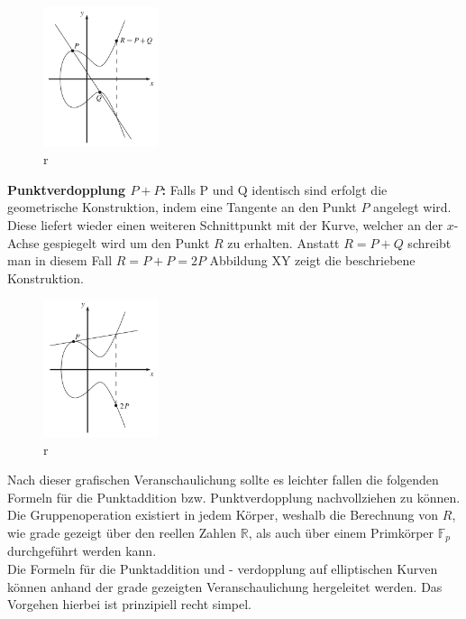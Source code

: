 \begin{figure}[H]
    \centering
    \includegraphics[width=0.3\textwidth]{grafiken/Punktaddition.PNG}
    \caption[Punktaddition]{r}
    \label{fig:Punktaddition}
\end{figure}

\textbf{Punktverdopplung $P + P$:}
Falls P und Q identisch sind erfolgt die geometrische Konstruktion, indem eine Tangente an den Punkt $P$ angelegt wird. Diese liefert wieder einen weiteren Schnittpunkt mit der Kurve, welcher an der $x$-Achse gespiegelt wird um den Punkt $R$ zu erhalten. Anstatt $R = P + Q$ schreibt man in diesem Fall $R = P + P = 2P$   Abbildung XY zeigt die beschriebene Konstruktion. 

\begin{figure}[H]
    \centering
    \includegraphics[width=0.3\textwidth]{grafiken/Punktverdopplung.PNG}
    \caption[Punktverdopplung]{r}
    \label{fig:Punktverdopplung}
\end{figure}

Nach dieser grafischen Veranschaulichung sollte es leichter fallen die folgenden Formeln für die Punktaddition bzw. Punktverdopplung nachvollziehen zu können. Die Gruppenoperation existiert in jedem Körper, weshalb die Berechnung von $R$, wie grade gezeigt über den reellen Zahlen $\mathbb{R}$, als auch über einem Primkörper $\mathbb{F}_p$ durchgeführt werden kann.\\

Die Formeln für die Punktaddition und - verdopplung auf elliptischen Kurven können anhand der grade gezeigten Veranschaulichung hergeleitet werden. Das Vorgehen hierbei ist prinzipiell recht simpel.\\ 

